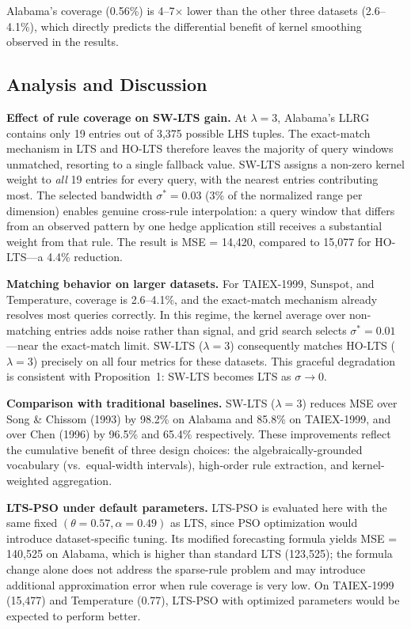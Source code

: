\documentclass[conference]{IEEEtran}
\begin{document}
Alabama's coverage (0.56\%) is 4--7$\times$ lower than the other
three datasets (2.6--4.1\%), which directly predicts the differential
benefit of kernel smoothing observed in the results.

\subsection{Analysis and Discussion}

\textbf{Effect of rule coverage on SW-LTS gain.}
At $\lambda=3$, Alabama's LLRG contains only 19 entries out of 3,375
possible LHS tuples. The exact-match mechanism in LTS and HO-LTS
therefore leaves the majority of query windows unmatched, resorting
to a single fallback value. SW-LTS assigns a non-zero kernel weight
to \emph{all} 19 entries for every query, with the nearest entries
contributing most. The selected bandwidth $\sigma^*=0.03$ (3\% of the
normalized range per dimension) enables genuine cross-rule interpolation:
a query window that differs from an observed pattern by one hedge
application still receives a substantial weight from that rule. The
result is MSE = 14,420, compared to 15,077 for HO-LTS---a 4.4\%
reduction.

\textbf{Matching behavior on larger datasets.}
For TAIEX-1999, Sunspot, and Temperature, coverage is 2.6--4.1\%, and
the exact-match mechanism already resolves most queries correctly.
In this regime, the kernel average over non-matching entries adds noise
rather than signal, and grid search selects $\sigma^*=0.01$---near
the exact-match limit. SW-LTS ($\lambda=3$) consequently matches
HO-LTS ($\lambda=3$) precisely on all four metrics for these datasets.
This graceful degradation is consistent with Proposition~1: SW-LTS
becomes LTS as $\sigma \to 0$.

\textbf{Comparison with traditional baselines.}
SW-LTS ($\lambda=3$) reduces MSE over Song \& Chissom (1993) by 98.2\%
on Alabama and 85.8\% on TAIEX-1999, and over Chen (1996) by 96.5\%
and 65.4\% respectively. These improvements reflect the cumulative
benefit of three design choices: the algebraically-grounded vocabulary
(vs.\ equal-width intervals), high-order rule extraction, and
kernel-weighted aggregation.

\textbf{LTS-PSO under default parameters.}
LTS-PSO is evaluated here with the same fixed $(\theta=0.57,
\alpha=0.49)$ as LTS, since PSO optimization would introduce
dataset-specific tuning. Its modified forecasting formula yields
MSE = 140,525 on Alabama, which is higher than standard LTS
(123,525); the formula change alone does not address the sparse-rule
problem and may introduce additional approximation error when rule
coverage is very low. On TAIEX-1999 (15,477) and Temperature (0.77),
LTS-PSO with optimized parameters would be expected to perform better.
\end{document}
